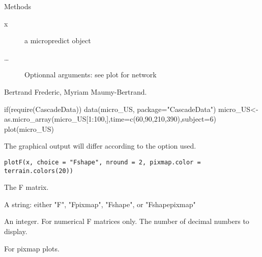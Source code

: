 \documentclass[a4paper]{book}
\begin{document}
\begin{Section}{Methods}
\begin{description}
\begin{description}
\begin{description}
\end{description}


\end{description}


\item[\code{signature(x = "micropredict", y = "ANY",...)}] 
\begin{description}

\item[x] a micropredict object
\item[\dots] Optionnal arguments: see plot for network

\end{description}


\end{description}

\end{Section}
%
\begin{Author}\relax
Bertrand Frederic, Myriam Maumy-Bertrand.
\end{Author}
%
\begin{Examples}
\begin{ExampleCode}
if(require(CascadeData)){
data(micro_US, package="CascadeData")
micro_US<-as.micro_array(micro_US[1:100,],time=c(60,90,210,390),subject=6)
plot(micro_US)
}
\end{ExampleCode}
\end{Examples}
%
\begin{Description}\relax
The graphical output will differ according to the option used.
\end{Description}
%
\begin{Usage}
\begin{verbatim}
plotF(x, choice = "Fshape", nround = 2, pixmap.color = terrain.colors(20))
\end{verbatim}
\end{Usage}
%
\begin{Arguments}
\begin{ldescription}
\item[\code{x}] The F matrix.
\item[\code{choice}] A string: either "F", "Fpixmap", "Fshape", or "Fshapepixmap"
\item[\code{nround}] An integer. For numerical F matrices only. The number of decimal numbers to display.
\item[\code{pixmap.color}] For pixmap plots.
\end{ldescription}
\end{Arguments}
\end{document}
